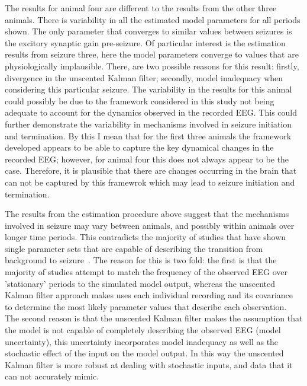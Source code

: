 The results for animal four are different to the results from the other three animals. There is variability in all the estimated model parameters for all periods shown. The only parameter that converges to similar values between seizures is the excitory synaptic gain pre-seizure. Of particular interest is the estimation results from seizure three, here the model parameters converge to values that are physiologically implausible. There, are two possible reasons for this result: firstly, divergence in the unscented Kalman filter; secondly, model inadequacy when considering this particular seizure. The variability in the results for this animal could possibly be due to the framework considered in this study not being adequate to account for the dynamics observed in the recorded EEG. This could further demonstrate the variability in mechanisms involved in seizure initiation and termination. By this I mean that for the first three animals the framework developed appears to be able to capture the key dynamical changes in the recorded EEG; however, for animal four this does not always appear to be the case. Therefore, it is plausible that there are changes occurring in the brain that can not be captured by this framewrok which may lead to seizure initiation and termination.


The results from the estimation procedure above suggest that the mechanisms involved in seizure may vary between animals, and possibly within animals over longer time periods. This contradicts the majority of studies that have shown single parameter sets that are capable of describing the transition from background to seizure~\citep{wendling2005interictal}. The reason for this is two fold: the first is that the majority of studies attempt to match the frequency of the observed EEG over 'stationary' periods to the simulated model output, whereas the unscented Kalman filter approach makes uses each individual recording and its covariance to determine the most likely parameter values that describe each observation. The second reason is that the unscented Kalman filter makes the assumption that the model is not capable of completely describing the observed EEG (model uncertainty), this uncertainty incorporates model inadequacy as well as the stochastic effect of the input on the model output. In this way the unscented Kalman filter is more robust at dealing with stochastic inputs, and data that it can not accurately mimic.


